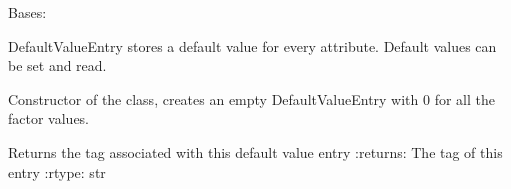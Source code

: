 \documentclass[letterpaper,10pt,english]{sphinxmanual}
\begin{document}
\begin{fulllineitems}
\label{\detokenize{apidoc/src.osm_configurator.model.project.configuration:src.osm_configurator.model.project.configuration.default_value_entry.DefaultValueEntry}}
\pysigstartsignatures
{}
\pysigstopsignatures
\sphinxAtStartPar
Bases: 

\sphinxAtStartPar
DefaultValueEntry stores a default value for every attribute.
Default values can be set and read.

\begin{fulllineitems}
\label{\detokenize{apidoc/src.osm_configurator.model.project.configuration:src.osm_configurator.model.project.configuration.default_value_entry.DefaultValueEntry.__init__}}
\pysigstartsignatures
{}
\pysigstopsignatures
\sphinxAtStartPar
Constructor of the class,
creates an empty DefaultValueEntry with 0 for all the factor values.

\end{fulllineitems}


\begin{fulllineitems}
\label{\detokenize{apidoc/src.osm_configurator.model.project.configuration:src.osm_configurator.model.project.configuration.default_value_entry.DefaultValueEntry.get_default_value_entry_tag}}
\pysigstartsignatures
{}
\pysigstopsignatures
\sphinxAtStartPar
Returns the tag associated with this default value entry
:returns: The tag of this entry
:rtype: str

\end{fulllineitems}



\end{fulllineitems}
\end{document}
